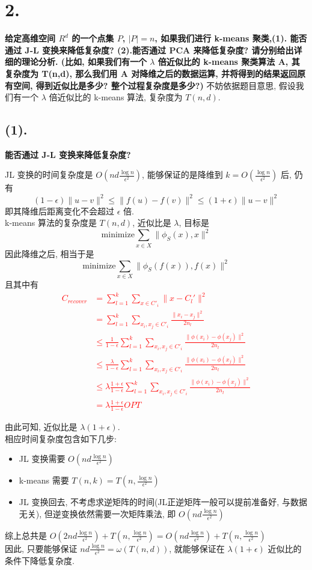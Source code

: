 \documentclass[UTF8]{article}
\newcommand{\jumpLine} {\hspace*{\fill} \par}
\begin{document}
\section*{2.}
\noindent \textbf{给定高维空间 $R^d$ 的一个点集 $P$, $|P|=n$, 如果我们进行 k-means 聚类,(1). 能否通过 J-L 变换来降低复杂度? (2).能否通过 PCA 来降低复杂度? 请分别给出详细的理论分析. (比如, 如果我们有一个 $\lambda$ 倍近似比的 k-means 聚类算法 A, 其复杂度为 T(n,d), 那么我们用 A 对降维之后的数据运算, 并将得到的结果返回原有空间, 得到近似比是多少? 整个过程复杂度是多少?)}
不妨依据题目意思, 假设我们有一个 $\lambda$ 倍近似比的 k-means 算法, 复杂度为 $T(n, d)$.
\subsection*{(1).}
\noindent \textbf{能否通过 J-L 变换来降低复杂度?}
\jumpLine \noindent 
JL 变换的时间复杂度是 $O(nd\frac{\log n}{\epsilon^2})$, 能够保证的是降维到 $k=O(\frac{\log n}{\epsilon^2})$ 后, 仍有
$$(1-\epsilon)\|u-v\|^2\le\|f(u)-f(v)\|^2\le(1+\epsilon)\|u-v\|^2$$
即其降维后距离变化不会超过 $\epsilon$ 倍. \\
k-means 算法的复杂度是 $T(n,d)$, 近似比是 $\lambda$, 目标是
$$\mathrm{minimize} \sum\limits_{x\in X}\|\phi_S(x),x\|^2$$
因此降维之后, 相当于是
$$\mathrm{minimize} \sum\limits_{x\in X}\|\phi_S(f(x)),f(x)\|^2$$
且其中有
\textcolor{red}{
\begin{align*}
	C_{recover} &= \sum\limits_{l=1}^k\sum\limits_{x\in C'_i}\|x - C_l'\|^2 \\
	&=\sum\limits_{l=1}^k\sum\limits_{x_i, x_j\in C'_i} \frac{\|x_i-x_j\|^2}{2n_l} \\
	&\le \frac{1}{1-\epsilon}\sum\limits_{l=1}^k\sum\limits_{x_i, x_j\in C'_i} \frac{\|\phi(x_i)-\phi(x_j)\|^2}{2n_l} \\
	&\le \frac{\lambda}{1-\epsilon}\sum\limits_{l=1}^k\sum\limits_{x_i, x_j\in C'_i} \frac{\|\phi(x_i)-\phi(x_j)\|^2}{2n_l} \\
	&\le \lambda\frac{1+\epsilon}{1-\epsilon}\sum\limits_{l=1}^k\sum\limits_{x_i, x_j\in C'_i} \frac{\|\phi(x_i)-\phi(x_j)\|^2}{2n_l} \\
	&=\lambda\frac{1+\epsilon}{1-\epsilon} OPT
\end{align*}
}

由此可知, 近似比是 $\lambda(1+\epsilon)$.\\
相应时间复杂度包含如下几步:
\begin{itemize}
	\item JL 变换需要 $O(nd\frac{\log n}{\epsilon^2})$
	\item k-means 需要 $T(n,k)=T(n,\frac{\log n}{\epsilon^2})$
	\item JL 变换回去, 不考虑求逆矩阵的时间(JL正逆矩阵一般可以提前准备好, 与数据无关), 但逆变换依然需要一次矩阵乘法, 即 $O(nd\frac{\log n}{\epsilon^2})$
\end{itemize}
综上总共是 $O(2nd\frac{\log n}{\epsilon^2}) + T(n,\frac{\log n}{\epsilon^2})=O(nd\frac{\log n}{\epsilon^2}) + T(n,\frac{\log n}{\epsilon^2})$\\
因此, 只要能够保证 $nd\frac{\log n}{\epsilon ^2}=\omega (T(n,d))$, 就能够保证在 $\lambda(1+\epsilon)$ 近似比的条件下降低复杂度.
\end{document}
